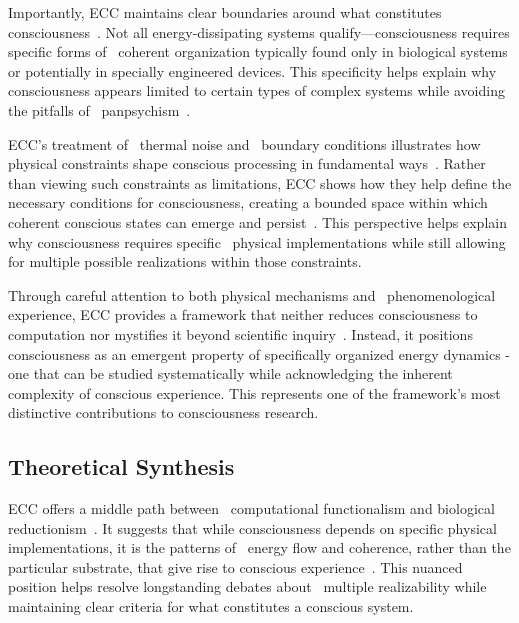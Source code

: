 Importantly, ECC maintains clear boundaries around what constitutes consciousness~\cite{churchland2013touching}. Not all energy-dissipating systems qualify—consciousness requires specific forms of~ coherent organization typically found only in biological systems or potentially in specially engineered devices. This specificity helps explain why consciousness appears limited to certain types of complex systems while avoiding the pitfalls of~ panpsychism~\cite{goff2019galileo, kauffman2019world}.

ECC's treatment of~ thermal noise and~ boundary conditions illustrates how~ physical constraints shape conscious processing in fundamental ways~\cite{rovelli2018order, bateson2002mind}. Rather than viewing such constraints as limitations, ECC shows how they help define the necessary conditions for consciousness, creating a bounded space within which coherent conscious states can emerge and persist~\cite{penrose2016fashion}. This perspective helps explain why consciousness requires specific~ physical implementations while still allowing for multiple possible realizations within those constraints.

Through careful attention to both physical mechanisms and~ phenomenological experience, ECC provides a framework that neither reduces consciousness to computation nor mystifies it beyond scientific inquiry~\cite{merleau2012phenomenology}. Instead, it positions consciousness as an emergent property of specifically organized energy dynamics - one that can be studied systematically while acknowledging the inherent complexity of conscious experience. This represents one of the framework's most distinctive contributions to consciousness research.

\subsection*{Theoretical Synthesis}

ECC offers a middle path between~ computational functionalism and biological reductionism~\cite{kelso2016dynamic}. It suggests that while consciousness depends on specific physical implementations, it is the patterns of~ energy flow and coherence, rather than the particular substrate, that give rise to conscious experience~\cite{varela2016embodied, haken2013principles}. This nuanced position helps resolve longstanding debates about~ multiple realizability while maintaining clear criteria for what constitutes a conscious system.

